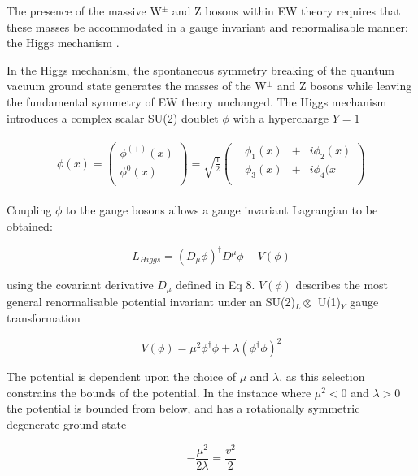 \documentclass[12pt,a4paper,epsf,portrait,times,epsfig]{article}
\begin{document}
		The presence of the massive W$^{\pm}$ and Z bosons within EW theory requires that these masses be accommodated in a gauge invariant and renormalisable manner: the Higgs mechanism \cite{Brout-Englert}\cite{Higgs}. \par
		In the Higgs mechanism, the spontaneous symmetry breaking of the quantum vacuum ground state generates the masses of the W$^\pm$ and Z bosons while leaving the fundamental symmetry of EW theory unchanged. The Higgs mechanism introduces a complex scalar SU(2) doublet $\phi$ with a hypercharge $Y = 1$
		
		\begin{align}
		\begin{split}
			\phi(x) = \begin{pmatrix}
				\phi^{(+)}(x) \\
				\phi^{0}(x) \\
			\end{pmatrix} = \sqrt{\frac{1}{2}}\begin{pmatrix}
				&\phi_{1}(x) &+ &i\phi_{2}(x) \\
				&\phi_{3}(x) &+ &i\phi_{4}(x \\
			\end{pmatrix}
		\end{split}
		\end{align}
		
		Coupling $\phi$ to the gauge bosons allows a gauge invariant Lagrangian to be obtained:
		
		\begin{equation}
			L_{Higgs} = (D_{\mu}\phi)^{\dagger}D^{\mu}\phi-V(\phi)
		\end{equation}
		
		using the covariant derivative $D_{\mu}$ defined in Eq 8. $V(\phi)$ describes the most general renormalisable potential invariant under an SU(2)$_{L} \otimes$ U(1)$_{Y}$ gauge transformation
		
		\begin{equation}
			V(\phi) = \mu^{2}\phi^{\dagger}\phi + \lambda(\phi^{\dagger}\phi)^{2}
		\end{equation}
		
		The potential is dependent upon the choice of $\mu$ and $\lambda$, as this selection constrains the bounds of the potential. In the instance where $\mu^{2} < 0$ and $\lambda> 0$ the potential is bounded from below, and has a rotationally symmetric degenerate ground state
		
		\begin{equation}
		-\frac{\mu^{2}}{2\lambda} = \frac{v^2}{2}
		\end{equation}
		
\end{document}
